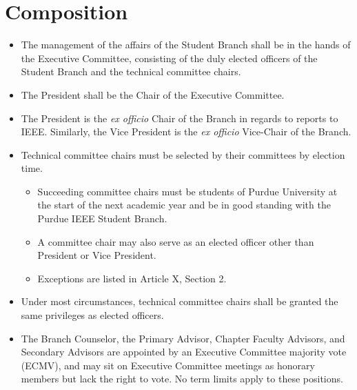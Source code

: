 \documentclass[12pt]{constitution}
\begin{document}
\section{Composition}
\label{sec:exec_comp}
\begin{itemize}
    \item The management of the affairs of the Student Branch shall be in the hands of the Executive Committee, consisting of the duly elected officers of the Student Branch and the technical committee chairs.
    \item The President shall be the Chair of the Executive Committee.
    \item The President is the \textit{ex officio} Chair of the Branch in regards to reports to IEEE. Similarly, the Vice President is the \textit{ex officio} Vice-Chair of the Branch.
    \item Technical committee chairs must be selected by their committees by election time.
    \begin{itemize}
        \item Succeeding committee chairs must be students of Purdue University at the start of the next academic year and be in good standing with the Purdue IEEE Student Branch.
        \item A committee chair may also serve as an elected officer other than President or Vice President.
		\item Exceptions are listed in Article X, Section 2.
    \end{itemize}
    \item Under most circumstances, technical committee chairs shall be granted the same privileges as elected officers.
    \item The Branch Counselor, the Primary Advisor, Chapter Faculty Advisors, and Secondary Advisors are appointed by an Executive Committee majority vote (ECMV), and may sit on Executive Committee meetings as honorary members but lack the right to vote. No term limits apply to these positions.
\end{itemize}
\end{document}

